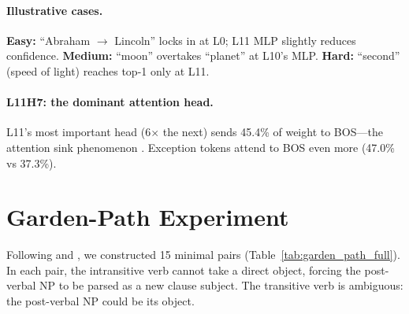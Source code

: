 \documentclass{article}
\begin{document}
\paragraph{Illustrative cases.}
\textbf{Easy:} ``Abraham $\to$ Lincoln'' locks in at L0; L11 MLP slightly
reduces confidence.
\textbf{Medium:} ``moon'' overtakes ``planet'' at L10's MLP.
\textbf{Hard:} ``second'' (speed of light) reaches top-1 only at L11.

\paragraph{L11H7: the dominant attention head.}
L11's most important head (6$\times$ the next) sends 45.4\% of weight to BOS---the
attention sink phenomenon \citep{xiao2023efficient}. Exception tokens attend to
BOS even more (47.0\% vs 37.3\%).

\section{Garden-Path Experiment}
\label{app:garden_path}

Following \citet{trueswell1993verb} and \citet{vangompel2001lexical}, we constructed 15 minimal pairs
(Table~\ref{tab:garden_path_full}).
In each pair, the intransitive verb cannot take a direct object, forcing
the post-verbal NP to be parsed as a new clause subject.
The transitive verb is ambiguous: the post-verbal NP could be its object.
\end{document}
